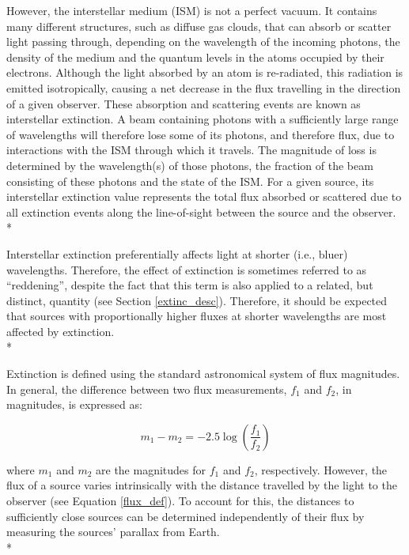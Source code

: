 \documentclass[12pt, a4paper]{report}
\begin{document}
However, the interstellar medium (ISM) is not a perfect vacuum. It contains many different structures, such as diffuse gas clouds, that can absorb or scatter light passing through, depending on the wavelength of the incoming photons, the density of the medium and the quantum levels in the atoms occupied by their electrons. Although the light absorbed by an atom is re-radiated, this radiation is emitted isotropically, causing a net decrease in the flux travelling in the direction of a given observer. These absorption and scattering events are known as interstellar extinction. A beam containing photons with a sufficiently large range of wavelengths will therefore lose some of its photons, and therefore flux, due to interactions with the ISM through which it travels. The magnitude of loss is determined by the wavelength(s) of those photons, the fraction of the beam consisting of these photons and the state of the ISM. For a given source, its interstellar extinction value represents the total flux absorbed or scattered due to all extinction events along the line-of-sight between the source and the observer.\\*

Interstellar extinction preferentially affects light at shorter (i.e., bluer) wavelengths. Therefore, the effect of extinction is sometimes referred to as ``reddening'', despite the fact that this term is also applied to a related, but distinct, quantity (see Section \ref{extinc_desc}). Therefore, it should be expected that sources with proportionally higher fluxes at shorter wavelengths are most affected by extinction. \\*

Extinction is defined using the standard astronomical system of flux magnitudes. In general, the difference between two flux measurements, $f_{1}$ and $f_{2}$, in magnitudes, is expressed as:

\begin{equation}
\label{mags_def}
m_{1} - m_{2} = -2.5\log \left( \frac{f_{1}}{f_{2}} \right)
\end{equation}

where $m_{1}$ and $m_{2}$ are the magnitudes for $f_{1}$ and $f_{2}$, respectively. However, the flux of a source varies intrinsically with the distance travelled by the light to the observer (see Equation \ref{flux_def}). To account for this, the distances to sufficiently close sources can be determined independently of their flux by measuring the sources' parallax from Earth. \\*
\end{document}
